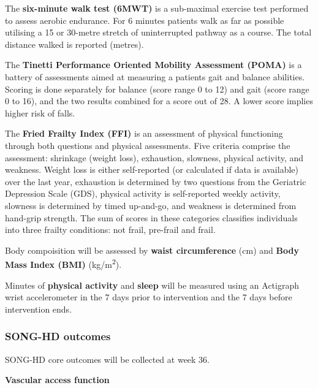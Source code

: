 \documentclass[11pt,parskip=half-]{scrartcl}
\begin{document}
\label{outcome:6mwt}
The \textbf{six-minute walk test (6MWT)} \cites{butland1982two}{buvcar2016six} is a sub-maximal exercise test performed to assess aerobic endurance. For 6 minutes patients walk as far as possible utilising a 15 or 30-metre stretch of uninterrupted pathway as a course. The total distance walked is reported (metres).

\label{outcome:poma}
The \textbf{Tinetti Performance Oriented Mobility Assessment (POMA)} \cites{tinetti1986fall}{wyngaert2020associations} is a battery of assessments aimed at measuring a patients gait and balance abilities. Scoring is done separately for balance (score range 0 to 12) and gait (score range 0 to 16), and the two results combined for a score out of 28. A lower score implies higher risk of falls.

\label{outcome:ffi}
The \textbf{Fried Frailty Index (FFI)} \cites{fried2001frailty}{het2015fried} is an assessment of physical functioning through both questions and physical assessments. Five criteria comprise the assessment: shrinkage (weight loss), exhaustion, slowness, physical activity, and weakness. Weight loss is either self-reported (or calculated if data is available) over the last year, exhaustion is determined by two questions from the Geriatric Depression Scale (GDS), physical activity is self-reported weekly activity, slowness is determined by timed up-and-go, and weakness is determined from hand-grip strength.
The sum of scores in these categories classifies individuals into three frailty conditions: not frail, pre-frail and frail.

\label{outcome:body}
Body compoisition will be assessed by \textbf{waist circumference} (cm) and \textbf{Body Mass Index (BMI)} (kg/m\textsuperscript{2}).

\label{outcome:actigraph}
Minutes of \textbf{physical activity} and \textbf{sleep} will be measured using an Actigraph wrist accelerometer in the 7 days prior to intervention and the 7 days before intervention ends.

\subsubsection{SONG-HD outcomes}\label{song-outcomes}

SONG-HD core outcomes will be collected at week 36.

\textbf{Vascular access function}
\end{document}
